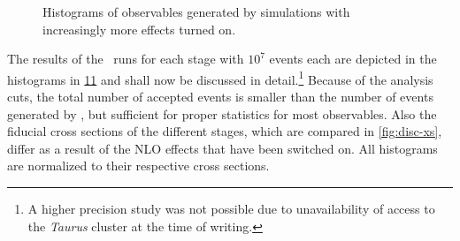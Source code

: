 \begin{figure}[ht]
  \centering
  \begin{subfigure}[t]{.49\textwidth}
    \caption{\label{fig:disc-total_pT}}
  \end{subfigure}
  \begin{subfigure}[t]{.49\textwidth}
    \caption{\label{fig:disc-azimuthal_angle}}
  \end{subfigure}
  \begin{subfigure}[t]{.49\textwidth}
    \caption{\label{fig:disc-pT}}
  \end{subfigure}
  \begin{subfigure}[t]{.49\textwidth}
    \caption{\label{fig:disc-pT_subl}}
  \end{subfigure}
  \begin{subfigure}[t]{.49\textwidth}
    \caption{\label{fig:disc-inv_m}}
  \end{subfigure}
\end{figure}
%
\begin{figure}[t]
  \centering \ContinuedFloat
  \begin{subfigure}[t]{.49\textwidth}
    \caption{\label{fig:disc-cos_theta}}
  \end{subfigure}
  \begin{subfigure}[t]{.49\textwidth}
    \caption{\label{fig:disc-eta}}
  \end{subfigure}
  \begin{subfigure}[t]{.49\textwidth}
    \caption{\label{fig:disc-o_angle}}
  \end{subfigure}
  \begin{subfigure}[t]{.49\textwidth}
    \caption{\label{fig:disc-o_angle_cs}}
  \end{subfigure}
  \caption{\label{fig:holhistos} Histograms of observables generated
    by simulations with increasingly more effects turned on.}
\end{figure}
%
The results of the \sherpa\ runs for each stage with \(10^7\) events
each are depicted in the histograms in \cref{fig:holhistos} and shall
now be discussed in detail.\footnote{A higher precision study was not
  possible due to unavailability of access to the \emph{Taurus}
  cluster at the time of writing.}  Because of the analysis cuts, the
total number of accepted events is smaller than the number of events
generated by \sherpa, but sufficient for proper statistics for most
observables. Also the fiducial cross sections of the different stages,
which are compared in \cref{fig:disc-xs}, differ as a result of the
NLO effects that have been switched on. All histograms are normalized
to their respective cross sections.

